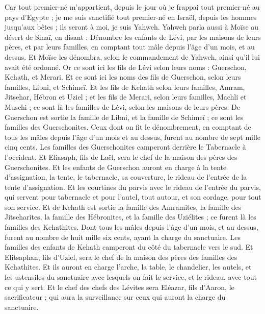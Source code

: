 \begin{multicols}{2}
Car tout premier-né m'appartient, depuis le jour où je frappai tout premier-né au pays d'Egypte ; je me suis sanctifié tout premier-né en Israël, depuis les hommes jusqu'aux bêtes ; ils seront à moi, je suis Yahweh.
Yahweh parla aussi à Moïse au désert de Sinaï, en disant :
Dénombre les enfants de Lévi, par les maisons de leurs pères, et par leurs familles, en comptant tout mâle depuis l'âge d'un mois, et au dessus.
Et Moïse les dénombra, selon le commandement de Yahweh, ainsi qu'il lui avait été ordonné.
Or ce sont ici les fils de Lévi selon leurs noms : Guerschon, Kehath, et Merari.
Et ce sont ici les noms des fils de Guerschon, selon leurs familles, Libni, et Schimeï.
Et les fils de Kehath selon leurs familles, Amram, Jitsehar, Hébron et Uziel ;
et les fils de Merari, selon leurs familles, Machli et Muschi ; ce sont là les familles de Lévi, selon les maisons de leurs pères.
De Guerschon est sortie la famille de Libni, et la famille de Schimeï ; ce sont les familles des Guerschonites.
Ceux dont on fit le dénombrement, en comptant de tous les mâles depuis l'âge d'un mois et au dessus, furent au nombre de sept mille cinq cents.
Les familles des Guerschonites camperont derrière le Tabernacle à l'occident.
Et Eliasaph, fils de Laël, sera le chef de la maison des pères des Guerschonites.
Et les enfants de Guerschon auront en charge à la tente d'assignation, la tente, le tabernacle, sa couverture, le rideau de l'entrée de la tente d'assignation.
Et les courtines du parvis avec le rideau de l'entrée du parvis, qui servent pour tabernacle et pour l'autel, tout autour, et son cordage, pour tout son service.
Et de Kehath est sortie la famille des Amramites, la famille des Jitseharites, la famille des Hébronites, et la famille des Uziélites ; ce furent là les familles des Kehathites.
Dont tous les mâles depuis l'âge d'un mois, et au dessus, furent au nombre de huit mille six cents, ayant la charge du sanctuaire.
Les familles des enfants de Kehath camperont du côté du tabernacle vers le sud.
Et Elitsaphan, fils d'Uziel, sera le chef de la maison des pères des familles des Kehathites.
Et ils auront en charge l'arche, la table, le chandelier, les autels, et les ustensiles du sanctuaire avec lesquels on fait le service, et le rideau, avec tout ce qui y sert.
Et le chef des chefs des Lévites sera Eléazar, fils d'Aaron, le sacrificateur ; qui aura la surveillance sur ceux qui auront la charge du sanctuaire.

\end{multicols}
